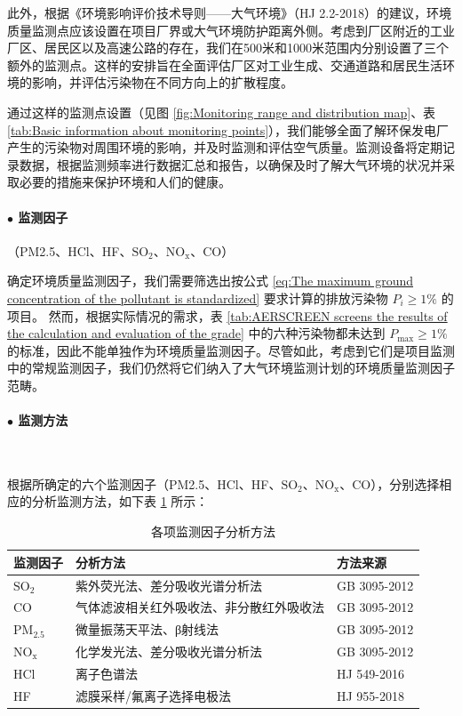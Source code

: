此外，根据《环境影响评价技术导则——大气环境》（HJ 2.2-2018）的建议，环境质量监测点应该设置在项目厂界或大气环境防护距离外侧。考虑到厂区附近的工业厂区、居民区以及高速公路的存在，我们在500米和1000米范围内分别设置了三个额外的监测点。这样的安排旨在全面评估厂区对工业生成、交通道路和居民生活环境的影响，并评估污染物在不同方向上的扩散程度。

通过这样的监测点设置（见图 \ref{fig:Monitoring range and distribution map}、表 \ref{tab:Basic information about monitoring points}），我们能够全面了解环保发电厂产生的污染物对周围环境的影响，并及时监测和评估空气质量。监测设备将定期记录数据，根据监测频率进行数据汇总和报告，以确保及时了解大气环境的状况并采取必要的措施来保护环境和人们的健康。


\paragraph{$\bullet$ 监测因子} （PM2.5、HCl、HF、$\mathrm{SO_2}$、$\mathrm{NO_x}$、CO）

确定环境质量监测因子，我们需要筛选出按公式 \ref{eq:The maximum ground concentration of the pollutant is standardized} 要求计算的排放污染物 $P_i \geqslant 1\%$ 的项目。\cite{HJ2.2-2018} 然而，根据实际情况的需求，表 \ref{tab:AERSCREEN screens the results of the calculation and evaluation of the grade} 中的六种污染物都未达到 $P_{\mathrm{max}} \geqslant 1\% $ 的标准，因此不能单独作为环境质量监测因子。尽管如此，考虑到它们是项目监测中的常规监测因子，我们仍然将它们纳入了大气环境监测计划的环境质量监测因子范畴。


\paragraph{$\bullet$ 监测方法}~{}\par

根据所确定的六个监测因子（PM2.5、HCl、HF、$\mathrm{SO_2}$、$\mathrm{NO_x}$、CO），分别选择相应的分析监测方法，如下表 \ref{tab:Various monitoring factor analysis methods} 所示：
\begin{table}[H]
    \centering
    \caption{各项监测因子分析方法}
    \begin{tabular}{lll}
    \toprule
    监测因子 & 分析方法  & 方法来源 \\
    \midrule
    $\mathrm{SO_2}$   & 紫外荧光法、差分吸收光谱分析法 & GB 3095-2012 \\
    CO    & 气体滤波相关红外吸收法、非分散红外吸收法 & GB 3095-2012 \\
    $\mathrm{PM_{2.5}}$ & 微量振荡天平法、β射线法 & GB 3095-2012 \\
    $\mathrm{NO_x}$   & 化学发光法、差分吸收光谱分析法 & GB 3095-2012 \\
    HCl   & 离子色谱法 & HJ 549-2016 \\
    HF    & 滤膜采样/氟离子选择电极法 & HJ 955-2018 \\
    \bottomrule
    \end{tabular}%
    \label{tab:Various monitoring factor analysis methods}%
\end{table}%


